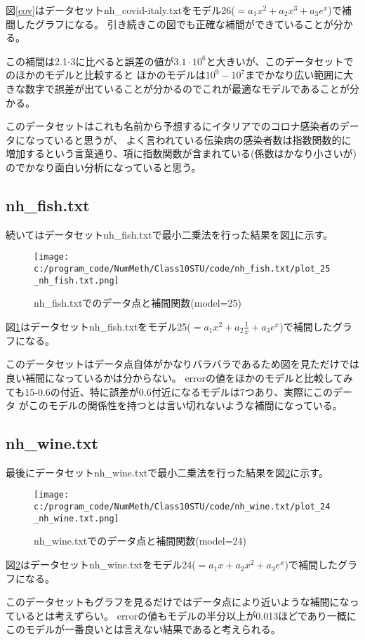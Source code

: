 \documentclass[a4paper,11pt,dvipdfmx]{jsarticle}
\begin{document}
図\ref{cov}はデータセットnh\_covid-italy.txtをモデル26($=a_1x^2+a_2x^3+a_3e^x$)で補間したグラフになる。
引き続きこの図でも正確な補間ができていることが分かる。

この補間は2.1-3に比べると誤差の値が$3.1 \cdot 10^6$と大きいが、このデータセットでのほかのモデルと比較すると
ほかのモデルは$10^9-10^7$までかなり広い範囲に大きな数字で誤差が出ていることが分かるのでこれが最適なモデルであることが分かる。

このデータセットはこれも名前から予想するにイタリアでのコロナ感染者のデータになっていると思うが、
よく言われている伝染病の感染者数は指数関数的に増加するという言葉通り、項に指数関数が含まれている(係数はかなり小さいが)
のでかなり面白い分析になっていると思う。

\subsection{nh\_fish.txt}
続いてはデータセットnh\_fish.txtで最小二乗法を行った結果を図\ref{fish}に示す。
\begin{figure}[h]
\centering
\texttt{[image: c:/program\_code/NumMeth/Class10STU/code/nh\_fish.txt/plot\_25\_nh\_fish.txt.png]}
\caption{nh\_fish.txtでのデータ点と補間関数(model=25)}
\label{fish}
\end{figure}

図\ref{fish}はデータセットnh\_fish.txtをモデル25($=a_1x^2+a_2\frac{1}{x}+a_3e^x$)で補間したグラフになる。

このデータセットはデータ点自体がかなりバラバラであるため図を見ただけでは良い補間になっているかは分からない。
errorの値をほかのモデルと比較してみても15-0.6の付近、特に誤差が0.6付近になるモデルは7つあり、実際にこのデータ
がこのモデルの関係性を持つとは言い切れないような補間になっている。

\subsection{nh\_wine.txt}
最後にデータセットnh\_wine.txtで最小二乗法を行った結果を図\ref{wine}に示す。
\begin{figure}[h]
\centering
\texttt{[image: c:/program\_code/NumMeth/Class10STU/code/nh\_wine.txt/plot\_24\_nh\_wine.txt.png]}
\caption{nh\_wine.txtでのデータ点と補間関数(model=24)}
\label{wine}
\end{figure}
図\ref{wine}はデータセットnh\_wine.txtをモデル24($=a_1x+a_2x^2+a_3e^x$)で補間したグラフになる。

このデータセットもグラフを見るだけではデータ点により近いような補間になっているとは考えずらい。
errorの値もモデルの半分以上が0.013ほどであり一概にこのモデルが一番良いとは言えない結果であると考えられる。

\newpage




\end{document}
